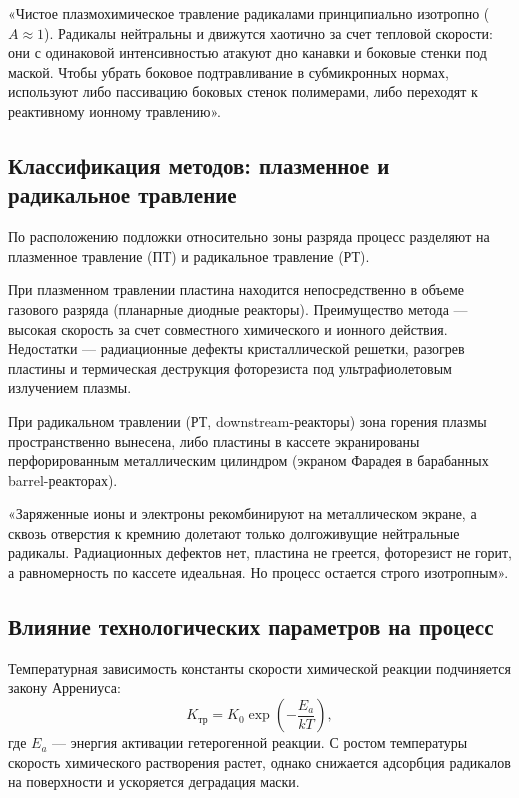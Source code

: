 \documentclass[12pt,a4paper]{article}
\theoremstyle{plain}
\theoremstyle{definition}
\theoremstyle{remark}
\numberwithin{equation}{section}
\begin{document}
«Чистое плазмохимическое травление радикалами принципиально изотропно ($A \approx 1$). Радикалы нейтральны и движутся хаотично за счет тепловой скорости: они с одинаковой интенсивностью атакуют дно канавки и боковые стенки под маской. Чтобы убрать боковое подтравливание в субмикронных нормах, используют либо пассивацию боковых стенок полимерами, либо переходят к реактивному ионному травлению».

\subsection{Классификация методов: плазменное и радикальное травление}

По расположению подложки относительно зоны разряда процесс разделяют на плазменное травление (ПТ) и радикальное травление (РТ).

При плазменном травлении пластина находится непосредственно в объеме газового разряда (планарные диодные реакторы). Преимущество метода --- высокая скорость за счет совместного химического и ионного действия. Недостатки --- радиационные дефекты кристаллической решетки, разогрев пластины и термическая деструкция фоторезиста под ультрафиолетовым излучением плазмы.

При радикальном травлении (РТ, downstream-реакторы) зона горения плазмы пространственно вынесена, либо пластины в кассете экранированы перфорированным металлическим цилиндром (экраном Фарадея в барабанных barrel-реакторах).

«Заряженные ионы и электроны рекомбинируют на металлическом экране, а сквозь отверстия к кремнию долетают только долгоживущие нейтральные радикалы. Радиационных дефектов нет, пластина не греется, фоторезист не горит, а равномерность по кассете идеальная. Но процесс остается строго изотропным».

\subsection{Влияние технологических параметров на процесс}

Температурная зависимость константы скорости химической реакции подчиняется закону Аррениуса:
\begin{equation*}
  K_\text{тр} = K_0 \exp\left(-\frac{E_a}{kT}\right),
\end{equation*}
где $E_a$ --- энергия активации гетерогенной реакции. С ростом температуры скорость химического растворения растет, однако снижается адсорбция радикалов на поверхности и ускоряется деградация маски.
\end{document}
